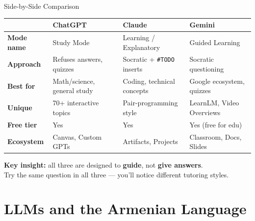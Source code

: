 \documentclass[aspectratio=169]{beamer}
\begin{document}
\begin{frame}{Side-by-Side Comparison}

\begin{center}
\small
\begin{tabular}{@{}l p{3.5cm} p{3.5cm} p{3.5cm}@{}}
\toprule
& \textbf{\color{popblue}ChatGPT} & \textbf{\color{violet1}Claude} & \textbf{\color{paramgreen}Gemini} \\
\midrule
\textbf{Mode name} & Study Mode & Learning / Explanatory & Guided Learning \\[4pt]
\textbf{Approach} & Refuses answers, quizzes & Socratic + \texttt{\#TODO} inserts & Socratic questioning \\[4pt]
\textbf{Best for} & Math/science, general study & Coding, technical concepts & Google ecosystem, quizzes \\[4pt]
\textbf{Unique} & 70+ interactive topics & Pair-programming style & LearnLM, Video Overviews \\[4pt]
\textbf{Free tier} & Yes & Yes & Yes (free for edu) \\[4pt]
\textbf{Ecosystem} & Canvas, Custom GPTs & Artifacts, Projects & Classroom, Docs, Slides \\
\bottomrule
\end{tabular}
\end{center}

\bigskip
\begin{center}
\textbf{Key insight:} all three are designed to \textbf{guide}, not \textbf{give answers}.\\
Try the same question in all three --- you'll notice different tutoring styles.
\end{center}
\end{frame}

\section{LLMs and the Armenian Language}
\end{document}
